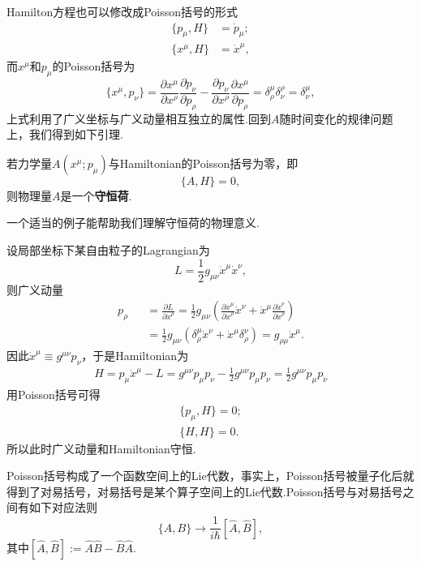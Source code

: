\documentclass[10pt]{article}
\begin{document}
	Hamilton方程也可以修改成Poisson括号的形式
	\begin{equation}
	\begin{split}
		\{p_\mu,H\}&={\dot{p}_\mu};\\
		\{x^\mu,H\}&={\dot{x}}^\mu,
	\end{split}
	\end{equation}
	而$x^\mu$和$p_\mu$的Poisson括号为
	\begin{equation}
	\{x^\mu,p_\nu\}=\frac{\partial x^\mu}{\partial x^\rho}\frac{\partial p_\nu}{\partial p_\rho}-\frac{\partial p_\nu}{\partial x^\rho}\frac{\partial x^\mu}{\partial p_\rho}=\delta^\mu_\rho\delta^\rho_\nu=\delta^\mu_\nu,
	\end{equation}
	上式利用了广义坐标与广义动量相互独立的属性.回到$A$随时间变化的规律问题上，我们得到如下引理.
	\begin{lemma}
	若力学量$A(x^\mu;p_\mu)$与Hamiltonian的Poisson括号为零，即
	\begin{equation}
		\{A,H\}=0,
	\end{equation}
	则物理量$A$是一个\textbf{守恒荷}.
	\end{lemma}
	一个适当的例子能帮助我们理解守恒荷的物理意义.
	\begin{example}
	设局部坐标下某自由粒子的Lagrangian为
	$$L=\frac{1}{2}g_{\mu\nu}\dot{x}^\mu\dot{x}^\nu,$$
	则广义动量
	\begin{eqnarray*}
		p_\rho&&=\frac{\partial L}{\partial {\dot{x}}^\rho}=\frac{1}{2}g_{\mu\nu}\left(\frac{\partial \dot{x}^\mu}{\partial {\dot{x}}^\rho}\dot{x}^\nu+\dot{x}^\mu\frac{\partial \dot{x}^\nu}{\partial {\dot{x}}^\rho}\right)\\
		&&=\frac{1}{2}g_{\mu\nu}\left(\delta^\mu_\rho\dot{x}^\nu+\dot{x}^\mu\delta^\nu_\rho\right)=g_{\rho\mu}\dot{x}^\mu.
	\end{eqnarray*}
	因此$\dot{x}^\mu\equiv g^{\mu\nu}p_\nu$，于是Hamiltonian为
	\begin{eqnarray*}
		H=p_\mu{\dot{x}}^\mu-L=g^{\mu\nu}p_\mu p_\nu-\frac{1}{2}g^{\mu\nu}p_\mu p_\nu=\frac{1}{2}g^{\mu\nu}p_\mu p_\nu	
	\end{eqnarray*}
	用Poisson括号可得
	\begin{eqnarray*}
		\{p_\mu,H\}=0;\\
		\{H,H\}=0.
	\end{eqnarray*}	
	所以此时广义动量和Hamiltonian守恒.
	\end{example}

	Poisson括号构成了一个函数空间上的Lie代数，事实上，Poisson括号被量子化后就得到了对易括号，对易括号是某个算子空间上的Lie代数.Poisson括号与对易括号之间有如下对应法则
	\begin{equation}
	\{A,B\}\rightarrow\frac{1}{i\hbar}[\hat{A},\hat{B}],
	\end{equation}
	其中$[\hat{A},\hat{B}]:=\hat{A}\hat{B}-\hat{B}\hat{A}$.
\end{document}

